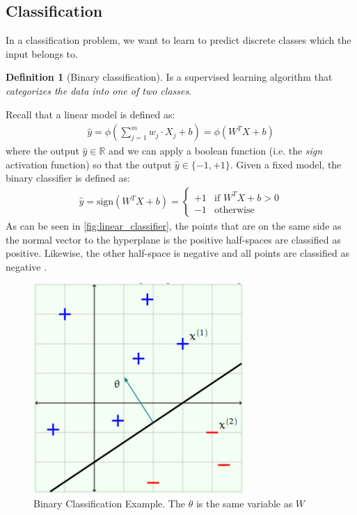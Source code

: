 \documentclass[11pt]{article}
\numberwithin{equation}{section}
\theoremstyle{definition}%
\newtheorem{definition}{Definition}[section]%
\begin{document}
\subsection{Classification}

In a classification problem, we want to learn to predict discrete classes which the input belongs to. 

\begin{definition}[Binary classification] Is a supervised learning algorithm that \emph{categorizes the data into one of two classes}.
\end{definition}

Recall that a linear model is defined as: 
\begin{align}
    \hat{y} = \phi \left (\sum_{j=1}^{m}{w_j \cdot X_j + b} \right ) = \phi (W^{T}X + b)
\end{align}
% 
where the output $\hat{y} \in \mathbb{R}$ and we can apply a boolean function (i.e. the \emph{sign} activation function) so that the output $\hat{y} \in \{-1, +1\}$. Given a fixed model, the binary classifier is defined as:
\begin{align}
    \hat{y} = \text{sign}(W^{T}X + b) = \begin{cases}
        +1 & \text{if $W^{T}X + b > 0$}\\
        -1 & \text{otherwise}
    \end{cases}
\end{align}
As can be seen in \autoref{fig:linear_classifier}, the points that are on the same side as the normal vector to the hyperplane is the positive half-spaces are classified as positive. Likewise, the other half-space is negative and all points are classified as negative \cite{MIT}. 
\begin{figure}[h]%
    \centering
    \includegraphics[width=8cm]{./Figs/linear_classifer.png}%
    \qquad
    \caption{Binary Classification Example. The $\theta$ is the same variable as $W$ \cite{MIT}}%
    \label{fig:linear_classifier}%
\end{figure}
\end{document}
